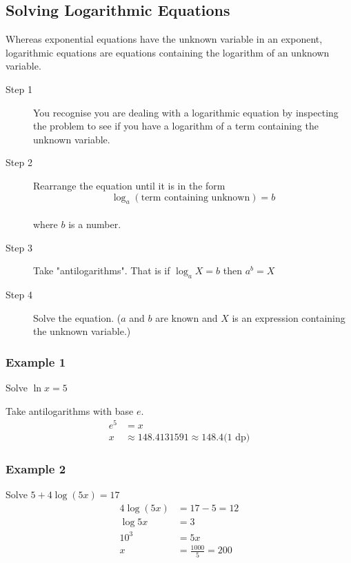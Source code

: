 \subsection{Solving Logarithmic Equations}
Whereas exponential equations have the unknown variable in an exponent, logarithmic equations are equations containing the logarithm of an unknown
variable. 


\begin{description}
\item [Step 1] You recognise you are dealing with a logarithmic equation
by inspecting the problem to see if you have a logarithm of a term containing the unknown variable. 

\item [Step
2] Rearrange the equation until it is in the form
\begin{equation*}\log _{a} \left (\text{term containing unknown}\right ) =b
\end{equation*} \\\relax where $b$ is a number. 

\item [Step 3] Take
"antilogarithms". That is if $\log _{a} X =b$ then $a^{b} =X$ 

\item [Step 4] Solve the equation.
($a$ and $b$ are known and $X$ is an expression containing the unknown variable.) \end{description}

\subsubsection{Example 1}
Solve $\ln  x =5$ 

Take antilogarithms with base $e$.
\begin{align*}e^{5} &  = x \\
x &  \approx 148.4131591 \approx 148.4\text{(1 dp)}\end{align*}

\subsubsection{Example 2}
Solve $5 +4 \log  \left (5 x\right ) =17$
\begin{align*}4 \log  \left (5 x\right ) &  = 17 -5 =12 \\
\log  5 x &  = 3 \\
\text{}10^{3} &  = 5 x \\
x &  = \frac{1000}{5} =200\end{align*}

